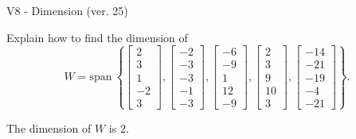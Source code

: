\begin{exercise}
  \begin{exerciseTitle}V8 - Dimension (ver. 25)\end{exerciseTitle}
  \begin{exerciseStatement}
    Explain how to find the dimension of 
\[W=\mathrm{span}\ \left\{\left[\begin{array}{r}
2 \\
3 \\
1 \\
-2 \\
3
\end{array}\right] , \left[\begin{array}{r}
-2 \\
-3 \\
-3 \\
-1 \\
-3
\end{array}\right] , \left[\begin{array}{r}
-6 \\
-9 \\
1 \\
12 \\
-9
\end{array}\right] , \left[\begin{array}{r}
2 \\
3 \\
9 \\
10 \\
3
\end{array}\right] , \left[\begin{array}{r}
-14 \\
-21 \\
-19 \\
-4 \\
-21
\end{array}\right]\right\}.\]



  \end{exerciseStatement}
  \begin{exerciseAnswer}
   The dimension of \(W\) is  \(2\).
  


  \end{exerciseAnswer}
\end{exercise}